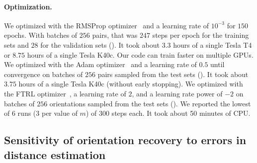 \paragraph{Optimization.}
We optimized  with the RMSProp optimizer~\cite{tieleman2012rmsprop} and a learning rate of $10^{-3}$ for $150$ epochs.
With batches of $256$ pairs, that was $247$ steps per epoch for the training sets and $28$ for the validation sets ().
It took about $3.3$ hours of a single Tesla T4 or $8.75$ hours of a single Tesla K40c. Our code can train faster on multiple GPUs.
We optimized  with the Adam optimizer~\cite{kingma2014adam} and a learning rate of $0.5$ until convergence on batches of $256$ pairs sampled from the test sets ().
It took about $3.75$ hours of a single Tesla K40c (without early stopping).
We optimized  with the FTRL optimizer~\cite{mcmahan2013ftrl}, a learning rate of $2$, and a learning rate power of $-2$ on batches of $256$ orientations sampled from the test sets ().
We reported the lowest of 6 runs (3 per value of $m$) of 300 steps each.
It took about 50 minutes of CPU.


\subsection{Sensitivity of orientation recovery to errors in distance estimation}\label{sec:results:orientation-recovery:sensitivity}


